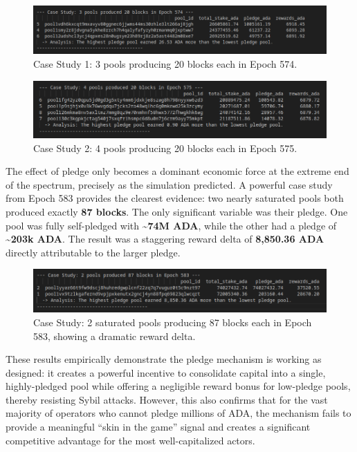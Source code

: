 \documentclass[11pt, letterpaper]{article}
\begin{document}
\begin{figure}[H]
	\centering
	\includegraphics[width=\textwidth]{img/20blocks-e574.png}
	\caption{Case Study 1: 3 pools producing 20 blocks each in Epoch 574.}
	\label{fig:20blocks-e574}
\end{figure}

\begin{figure}[H]
	\centering
	\includegraphics[width=\textwidth]{img/20blocks-e575.png}
	\caption{Case Study 2: 4 pools producing 20 blocks each in Epoch 575.}
	\label{fig:20blocks-e575}
\end{figure}

The effect of pledge only becomes a dominant economic force at the extreme end
of the spectrum, precisely as the simulation predicted. A powerful case study
from Epoch 583 provides the clearest evidence: two nearly saturated pools both
produced exactly \textbf{87 blocks}. The only significant variable was their
pledge. One pool was fully self-pledged with \textbf{\textasciitilde74M ADA},
while the other had a pledge of \textbf{\textasciitilde203k ADA}. The result
was a staggering reward delta of \textbf{8,850.36 ADA} directly attributable to
the larger pledge.

\begin{figure}[H]
	\centering
	\includegraphics[width=\textwidth]{img/87blocks-e584.png}
	\caption{Case Study: 2 saturated pools producing 87 blocks each in Epoch 583, showing a dramatic reward delta.}
	\label{fig:87blocks-e584}
\end{figure}

These results empirically demonstrate the pledge mechanism is working as designed: it creates
a powerful incentive to consolidate capital into a single, highly-pledged pool while offering a
negligible reward bonus for low-pledge pools, thereby resisting Sybil attacks. However, this
also confirms that for the vast majority of operators who cannot pledge millions of ADA, the
mechanism fails to provide a meaningful ``skin in the game'' signal and creates
a significant competitive advantage for the most well-capitalized actors.
\end{document}
